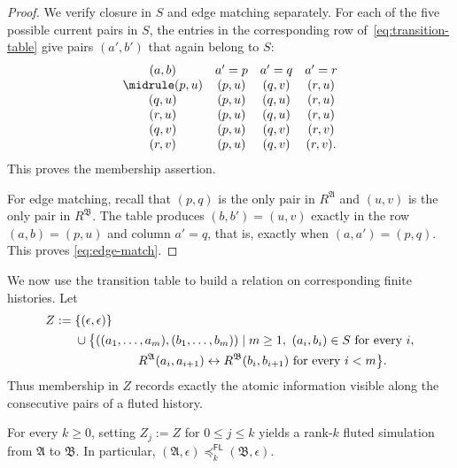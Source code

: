 \documentclass{lmcs}
\newcommand{\FL}{\mathsf{FL}}
\newcommand{\A}{\mathfrak{A}}
\newcommand{\B}{\mathfrak{B}}
\begin{document}
\begin{proof}
We verify closure in \(S\) and edge matching separately.  For each of the
five possible current pairs in \(S\), the entries in the corresponding row
of~\eqref{eq:transition-table} give pairs \((a',b')\) that again belong to
\(S\):
\[
\begin{array}{cccc}
  (a,b)&a'=p&a'=q&a'=r\\ \midrule
  (p,u)&(p,u)&(q,v)&(r,u)\\
  (q,u)&(p,u)&(q,u)&(r,u)\\
  (r,u)&(p,u)&(q,u)&(r,u)\\
  (q,v)&(p,u)&(q,v)&(r,v)\\
  (r,v)&(p,u)&(q,v)&(r,v).
\end{array}
\]
This proves the membership assertion.

For edge matching, recall that \((p,q)\) is the only pair in \(R^\A\) and
\((u,v)\) is the only pair in \(R^\B\).  The table produces
\((b,b')=(u,v)\) exactly in the row \((a,b)=(p,u)\) and column \(a'=q\),
that is, exactly when \((a,a')=(p,q)\).  This proves
\eqref{eq:edge-match}.
\end{proof}

We now use the transition table to build a relation on corresponding finite
histories.
Let
\begin{align*}
 Z:={}&\{(\epsilon,\epsilon)\}\\
 &{}\cup\bigl\{((a_1,\ldots,a_m),(b_1,\ldots,b_m))\mid m\geq1,
       \ (a_i,b_i)\in S\text{ for every }i,\\
 &\hspace{18mm}
       R^{\A}(a_i,a_{i+1})\leftrightarrow R^{\B}(b_i,b_{i+1})
       \text{ for every }i<m\bigr\}.
\end{align*}
Thus membership in $Z$ records exactly the atomic information visible along
the consecutive pairs of a fluted history.

\begin{lem}
\label{lem:concrete-simulation}
For every $k\geq0$, setting $Z_j:=Z$ for $0\leq j\leq k$ yields a rank-$k$
fluted simulation from \(\A\) to \(\B\).  In particular,
$(\A,\epsilon)\preccurlyeq_k^{\FL}(\B,\epsilon)$.
\end{lem}
\end{document}

